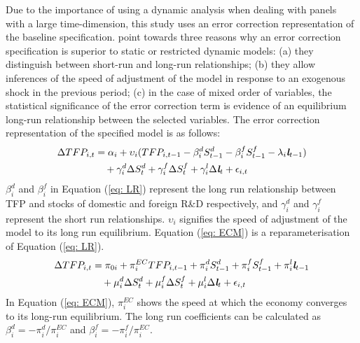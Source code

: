 \documentclass[12pt]{article}
\begin{document}
Due to the importance of using a dynamic analysis when dealing with panels with a large time-dimension, this study uses an error correction representation of the baseline specification. \citet{Eberhardt2015} point towards three reasons why an error correction specification is superior to static or restricted dynamic models: (a) they distinguish between short-run and long-run relationships; (b) they allow inferences of the speed of adjustment of the model in response to an exogenous shock in the previous period; (c) in the case of mixed order of variables, the statistical significance of the error correction term is evidence of an equilibrium long-run relationship between the selected variables. The error correction representation of the specified model is as follows:
\begin{align}
    \Delta TFP_{i,t} &= \alpha_i + \upsilon_i(TFP_{i,t-1} - \beta_i^d S_{t-1}^d - \beta_i^f S_{t-1}^f - \lambda_i \textit{\textbf{l}}_{t-1}) \notag \\
    &\quad + \gamma_i^d \Delta S_t^d + \gamma_i^f \Delta S_t^f + \gamma_i^l \Delta \textit{\textbf{l}}_t + \epsilon_{i,t} \label{eq: LR}
\end{align} 
$\beta_i^d$ and $\beta_i^f$ in Equation (\ref{eq: LR}) represent the long run relationship between TFP and stocks of domestic and foreign R\&D respectively, and $\gamma_i^d$ and $\gamma_i^f$ represent the short run relationships. $\upsilon_i$ signifies the speed of adjustment of the model to its long run equilibrium. Equation (\ref{eq: ECM}) is a reparameterisation of Equation (\ref{eq: LR}).
\begin{align}
    \Delta TFP_{i,t} &= \pi_{0i} + \pi_i^{EC} TFP_{i,t-1} + \pi_i^d S_{t-1}^d + \pi_i^f S_{t-1}^f + \pi_i^l \textit{\textbf{l}}_{t-1} \notag \\
    &\quad + \mu_i^d \Delta S_t^d + \mu_i^f \Delta S_t^f + \mu_i^l \Delta \textit{\textbf{l}}_t + \epsilon_{i,t} \label{eq: ECM}
\end{align}
In Equation (\ref{eq: ECM}), $\pi_i^{EC}$ shows the speed at which the economy converges to its long-run equilibrium. The long run coefficients can be calculated as $\beta_i^d=-\pi_i^d/\pi_i^{EC}$ and $\beta_i^f=-\pi_i^f/\pi_i^{EC}$.
 
\end{document}

